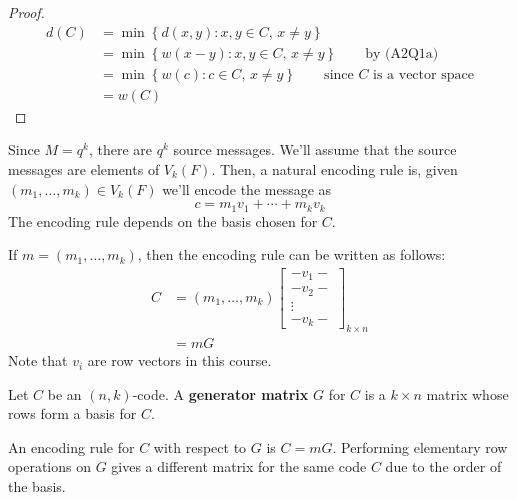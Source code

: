 \begin{proof}
    \begin{align*}
        d(C)
        &=\min \left\{ d(x,y):x,y\in C,\,x\neq y\right\}\\
        &=\min \left\{ w(x-y):x,y\in C,\,x\neq y\right\}\qquad\text{by (A2Q1a)}\\
        &=\min \left\{ w(c):c\in C,\,x\neq y\right\}\qquad\text{since $C$ is a vector space}\\
        &=w(C)
    \end{align*}
\end{proof}

Since $ M=q^k $, there are $ q^k $ source messages. We'll assume that the source
messages are elements of $ V_k(F) $. Then, a natural encoding rule is,
given $ (m_1,\ldots ,m_k)\in V_k(F) $ we'll encode the message as
\[ c=m_1v_1+\cdots+m_kv_k \]
The encoding rule depends on the basis chosen for $ C $.

If $ m=(m_1,\ldots ,m_k) $, then the encoding rule can be written as follows:
\begin{align*}
    C&=(m_1,\ldots ,m_k)
\begin{bmatrix}
    -v_1-\\
    -v_2-\\
    \vdots\\
    -v_k-
\end{bmatrix}_{k\times n}\\
&=mG
\end{align*}
Note that $ v_i $ are row vectors in this course.

\begin{defbox}
    \begin{definition}
    Let $ C $ be an $ (n,k) $-code. A \textbf{generator matrix} $ G $
    for $ C $ is a $ k\times n $ matrix whose rows form a basis for $ C $.
\end{definition} \end{defbox}

 An encoding rule for $ C $ with respect to $ G $ is $ C=mG $.
Performing elementary row operations on $ G $ gives
a different matrix for the same code $ C $ due to the order of the basis.